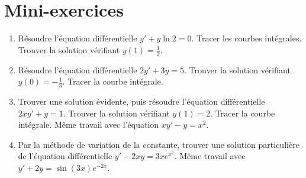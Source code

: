 \section*{Mini-exercices}

\begin{frame}
\begin{miniexercice}
\begin{enumerate} 
  \item Résoudre l'équation différentielle $y'+ y \ln 2 = 0$.
  Tracer les courbes intégrales. Trouver la solution vérifiant $y(1)=\frac12$.
  
  \item Résoudre l'équation différentielle $2y'+3y=5$.
  Trouver la solution vérifiant $y(0)=-\frac13$. Tracer la courbe intégrale.
  
  \item Trouver une solution évidente, puis résoudre l'équation 
  différentielle $2xy'+y=1$. Trouver la solution
  vérifiant $y(1)=2$. Tracer la courbe intégrale.
  Même travail avec l'équation $xy'-y=x^2$.
  
  \item Par la méthode de variation de la constante, trouver une solution
  particulière de l'équation différentielle $y'-2xy=3xe^{x^2}$.
  Même travail avec $y'+2y = \sin(3x)e^{-2x}$.
\end{enumerate}
\end{miniexercice}
\end{frame}





